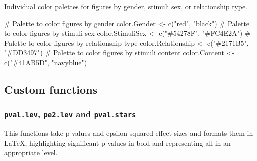\documentclass[
  bookmarksnumbered]{article}
\newenvironment{Shaded}{\begin{snugshade}}{\end{snugshade}}
\newcommand{\CommentTok}[1]{\textcolor[rgb]{0.50,0.62,0.50}{#1}}
\newcommand{\FunctionTok}[1]{\textcolor[rgb]{0.94,0.94,0.56}{#1}}
\newcommand{\NormalTok}[1]{\textcolor[rgb]{0.80,0.80,0.80}{#1}}
\newcommand{\OtherTok}[1]{\textcolor[rgb]{0.94,0.94,0.56}{#1}}
\newcommand{\StringTok}[1]{\textcolor[rgb]{0.80,0.58,0.58}{#1}}
\begin{document}
Individual color palettes for figures by gender, stimuli sex, or relationship type.

\begin{Shaded}
\begin{Highlighting}[]
\CommentTok{\# Palette to color figures by gender}
\NormalTok{color.Gender }\OtherTok{\textless{}{-}} \FunctionTok{c}\NormalTok{(}\StringTok{"red"}\NormalTok{, }\StringTok{"black"}\NormalTok{)}
\CommentTok{\# Palette to color figures by stimuli sex}
\NormalTok{color.StimuliSex }\OtherTok{\textless{}{-}} \FunctionTok{c}\NormalTok{(}\StringTok{"\#54278F"}\NormalTok{, }\StringTok{"\#FC4E2A"}\NormalTok{)}
\CommentTok{\# Palette to color figures by relationship type}
\NormalTok{color.Relationship }\OtherTok{\textless{}{-}} \FunctionTok{c}\NormalTok{(}\StringTok{"\#2171B5"}\NormalTok{, }\StringTok{"\#DD3497"}\NormalTok{)}
\CommentTok{\# Palette to color figures by stimuli content}
\NormalTok{color.Content }\OtherTok{\textless{}{-}} \FunctionTok{c}\NormalTok{(}\StringTok{"\#41AB5D"}\NormalTok{, }\StringTok{"navyblue"}\NormalTok{)}
\end{Highlighting}
\end{Shaded}

\subsection{Custom functions}\label{custom-functions}

\subsubsection{\texorpdfstring{\texttt{pval.lev}, \texttt{pe2.lev} and \texttt{pval.stars}}{pval.lev, pe2.lev and pval.stars}}\label{pval.lev-pe2.lev-and-pval.stars}

This functions take p-values and epsilon squared effect sizes and formats them in \LaTeX, highlighting significant p-values in bold and representing all in an appropriate level.
\end{document}
